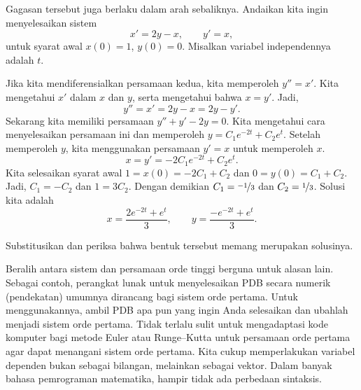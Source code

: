 \begin{example}
Gagasan tersebut juga berlaku dalam arah sebaliknya.
Andaikan kita ingin menyelesaikan
sistem
\begin{equation*}
x' = 2y-x , \qquad
y' = x,
\end{equation*}
untuk syarat
awal $x(0) = 1$, $y(0) =0$.
Misalkan variabel independennya adalah $t$.

Jika kita mendiferensialkan persamaan kedua, kita memperoleh
$y''=x'$.  Kita mengetahui $x'$ dalam $x$ dan $y$, serta
mengetahui bahwa $x=y'$.  Jadi,
\begin{equation*}
y'' = x' = 2y-x = 2y-y' .
\end{equation*}
Sekarang kita memiliki persamaan $y''+y'-2y = 0$.  Kita mengetahui cara menyelesaikan
persamaan ini dan memperoleh $y = C_1 e^{-2t} + C_2 e^t$.  Setelah memperoleh $y$,
kita menggunakan persamaan $y' = x$ untuk memperoleh $x$.
\begin{equation*}
x = y' = -2 C_1 e^{-2t} + C_2 e^t .
\end{equation*}
Kita selesaikan syarat awal $1 = x(0) = -2 C_1 + C_2$
dan $0 = y(0) = C_1 + C_2$.  Jadi, $C_1 = -C_2$ dan $1 = 3C_2$.
Dengan demikian $C_1 = \nicefrac{-1}{3}$ dan $C_2 = \nicefrac{1}{3}$.  Solusi kita adalah
\begin{equation*}
x = \frac{2e^{-2t} + e^t}{3} ,\qquad
y = \frac{-e^{-2t} + e^t}{3} .
\end{equation*}
\end{example}

\begin{exercise}
Substitusikan dan periksa bahwa bentuk tersebut memang merupakan solusinya.
\end{exercise}

Beralih antara sistem
dan persamaan orde tinggi
berguna untuk alasan lain.  Sebagai contoh, perangkat lunak untuk menyelesaikan PDB secara numerik
(pendekatan) umumnya dirancang bagi sistem orde pertama.  Untuk menggunakannya,
ambil PDB apa pun yang ingin Anda selesaikan dan ubahlah menjadi
sistem orde pertama.  Tidak terlalu sulit
untuk mengadaptasi kode komputer bagi metode Euler atau Runge--Kutta untuk
persamaan orde pertama agar
dapat menangani sistem orde pertama.
Kita cukup memperlakukan variabel dependen bukan sebagai
bilangan, melainkan sebagai vektor.  Dalam banyak bahasa pemrograman matematika, hampir
tidak ada perbedaan sintaksis.


